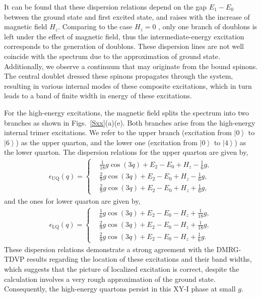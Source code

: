 \documentclass[aps,prx,showpacs,floatfix,twocolumn,superscriptaddress,nofootinbib,longbibliography]{revtex4-2}
\begin{document}
It can be found that these dispersion relations depend on the gap $E_1-E_0$ between the ground state and first excited state,  and raises with the increase of magnetic field $H_z$.
Comparing to the case $H_z=0$ \cite{cheng2022}, only one branch of doublons is left under the effect of magnetic field, thus the intermediate-energy excitation corresponds to the generation of doublons.
These dispersion lines are  not well coincide with the spectrum due to the approximation of  ground state. Additionally,  we observe a continuum that may originate  from the bound spinons.  The central doublet dressed these spinons  propagates through the system, resulting in various internal modes of these composite excitations, which in turn leads to a band of finite width in energy of these excitations. 


 For the high-energy excitations, the magnetic field splits the spectrum into two branches as shown in Figs.~\ref{Sxx}(a)(e).
 Both branches arise from the high-energy internal trimer excitations. We refer to the upper branch (excitation from  $\left|0\right\rangle$ to $\left|6\right\rangle$) as the  upper quarton, and the lower one (excitation from  $\left|0\right\rangle$ to $\left|4\right\rangle$) as the lower quarton.
The    dispersion relations for the  upper quarton are given by,
\begin{eqnarray}
	\label{high1}
\epsilon_{\mathrm{UQ}} (q)=\left\{
    \begin{split}
& \frac{1}{18} g \cos{(3q)}+E_2 -E_0 + H_z - \frac{1}{6}g,\\
& \frac{2}{9} g \cos{(3q)}+E_2 -E_0 + H_z - \frac{1}{6}g,\\
&\frac{2}{9} g \cos{(3q)}+E_2 -E_0 + H_z + \frac{1}{6}g,
\end{split}
\right.
\end{eqnarray}
and the ones for  lower quarton are given by,
\begin{eqnarray}
	\label{high2}
	\epsilon_{\mathrm{LQ}} (q)=\left\{
    \begin{split}
& \frac{1}{6} g \cos{(3q)}+E_2 -E_0 - H_z + \frac{1}{18}g,\\
& \frac{2}{9} g \cos{(3q)}+E_2 -E_0 - H_z + \frac{1}{18}g,\\
& \frac{2}{9} g \cos{(3q)}+E_2 -E_0 - H_z +\frac{1}{6}g.
\end{split}
\right.
\end{eqnarray}
 These dispersion relations demonstrate a strong agreement with the DMRG-TDVP results regarding the location of these excitations and their band widths, which suggests that the picture of localized excitation is correct,  despite  the calculation involves a very rough approximation of the ground state.
 Consequently, the high-energy  quartons  persist in this XY-I phase at small $g$.  
\end{document}
